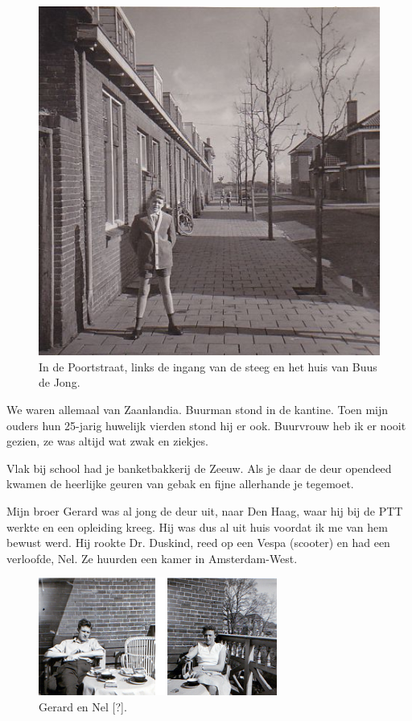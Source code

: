 \documentclass[10pt,twoside, openright]{memoir}
\begin{document}
\begin{figure}
\includegraphics[width=\textwidth]{img/ch5/poortstrsteeg}
\caption*{\footnotesize In de Poortstraat, links de ingang van de steeg en het huis van Buus de Jong.}
\end{figure}

We waren allemaal van Zaanlandia. Buurman stond in de kantine. Toen mijn ouders hun 25-jarig huwelijk vierden stond hij er ook. Buurvrouw heb ik er nooit gezien, ze was altijd wat zwak en ziekjes. 

Vlak bij school had je banketbakkerij de Zeeuw. Als je daar de deur opendeed kwamen de heerlijke geuren van gebak en fijne allerhande je tegemoet.

Mijn broer Gerard was al jong de deur uit, naar Den Haag, waar hij bij de PTT werkte en een opleiding kreeg. Hij was dus al uit huis voordat ik me van hem bewust werd. Hij rookte Dr. Duskind, reed op een Vespa (scooter) en had een verloofde, Nel. Ze huurden een kamer in Amsterdam-West.

\begin{figure}
\includegraphics[width=\textwidth]{img/ch5/gn0102}
\caption*{\footnotesize Gerard en Nel [?].}
\end{figure}
\end{document}
